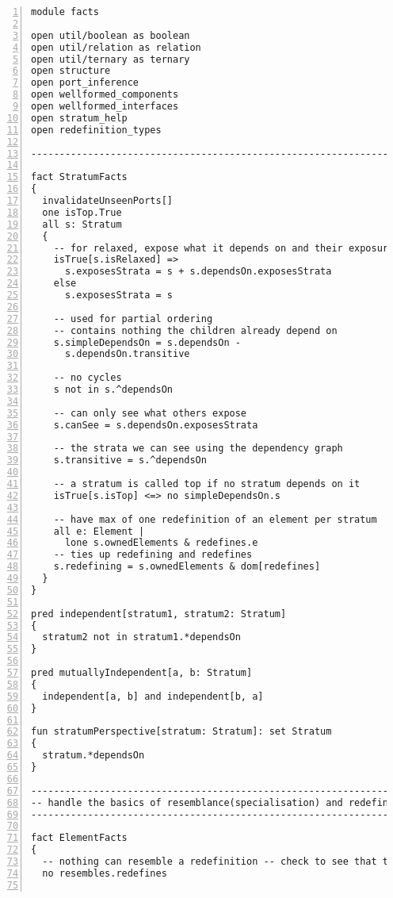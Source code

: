 \lstset{frame=tb, aboveskip=12pt, belowskip=-3pt, breaklines=true, basicstyle=\tiny\ttfamily, tabsize=2, mathescape=true}
\begin{lstlisting}[caption={facts.als}, numbers=left]
module facts

open util/boolean as boolean
open util/relation as relation
open util/ternary as ternary
open structure
open port_inference
open wellformed_components
open wellformed_interfaces
open stratum_help
open redefinition_types

--------------------------------------------------------------------

fact StratumFacts
{
  invalidateUnseenPorts[]
  one isTop.True
  all s: Stratum
  {
    -- for relaxed, expose what it depends on and their exposures
    isTrue[s.isRelaxed] =>
      s.exposesStrata = s + s.dependsOn.exposesStrata
    else
      s.exposesStrata = s

    -- used for partial ordering
    -- contains nothing the children already depend on
    s.simpleDependsOn = s.dependsOn -
      s.dependsOn.transitive

    -- no cycles
    s not in s.^dependsOn

    -- can only see what others expose
    s.canSee = s.dependsOn.exposesStrata
  
    -- the strata we can see using the dependency graph
    s.transitive = s.^dependsOn

    -- a stratum is called top if no stratum depends on it
    isTrue[s.isTop] <=> no simpleDependsOn.s
    
    -- have max of one redefinition of an element per stratum
    all e: Element |
      lone s.ownedElements & redefines.e
    -- ties up redefining and redefines
    s.redefining = s.ownedElements & dom[redefines]
  }
}

pred independent[stratum1, stratum2: Stratum]
{
  stratum2 not in stratum1.*dependsOn
}

pred mutuallyIndependent[a, b: Stratum]
{
  independent[a, b] and independent[b, a]
}

fun stratumPerspective[stratum: Stratum]: set Stratum
{
  stratum.*dependsOn
}

--------------------------------------------------------------------
-- handle the basics of resemblance(specialisation) and redefinition
--------------------------------------------------------------------

fact ElementFacts
{
  -- nothing can resemble a redefinition -- check to see that the things we resemble don't redefine
  no resembles.redefines
  

\end{lstlisting}
